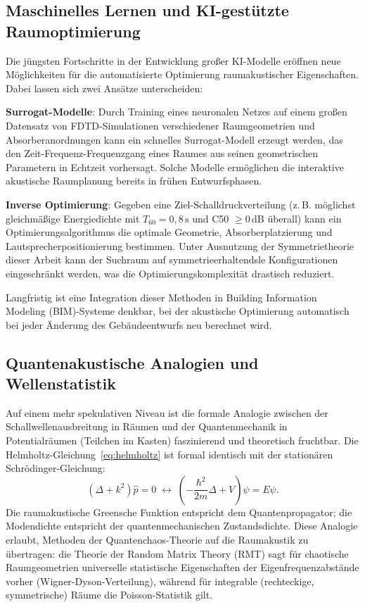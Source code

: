 ﻿\documentclass[12pt, a4paper]{article}
\theoremstyle{definition}
\theoremstyle{remark}
\begin{document}
\subsection{Maschinelles Lernen und KI-gestützte Raumoptimierung}

Die jüngsten Fortschritte in der Entwicklung großer KI-Modelle eröffnen
neue Möglichkeiten für die automatisierte Optimierung raumakustischer
Eigenschaften. Dabei lassen sich zwei Ansätze unterscheiden:

\textbf{Surrogat-Modelle}: Durch Training eines neuronalen Netzes auf
einem großen Datensatz von FDTD-Simulationen verschiedener Raumgeometrien
und Absorberanordnungen kann ein schnelles Surrogat-Modell erzeugt werden,
das den Zeit-Frequenz-Frequenzgang eines Raumes aus seinen geometrischen
Parametern in Echtzeit vorhersagt. Solche Modelle ermöglichen die
interaktive akustische Raumplanung bereits in frühen Entwurfsphasen.

\textbf{Inverse Optimierung}: Gegeben eine Ziel-Schalldruckverteilung
(z.\,B. möglichst gleichmäßige Energiedichte mit $T_{60} = 0{,}8\,\mathrm{s}$
und C50 $\geq 0$\,dB überall) kann ein Optimierungsalgorithmus
die optimale Geometrie, Absorberplatzierung und Lautsprecherpositionierung
bestimmen. Unter Ausnutzung der Symmetrietheorie dieser Arbeit kann der
Suchraum auf symmetrieerhaltendsle Konfigurationen eingeschränkt werden,
was die Optimierungskomplexität drastisch reduziert.

Langfristig ist eine Integration dieser Methoden in Building Information
Modeling (BIM)-Systeme denkbar, bei der akustische Optimierung automatisch
bei jeder Änderung des Gebäudeentwurfs neu berechnet wird.

\subsection{Quantenakustische Analogien und Wellenstatistik}

Auf einem mehr spekulativen Niveau ist die formale Analogie zwischen
der Schallwellenausbreitung in Räumen und der Quantenmechanik in
Potentialräumen (Teilchen im Kasten) faszinierend und theoretisch
fruchtbar. Die Helmholtz-Gleichung~\eqref{eq:helmholtz} ist formal
identisch mit der stationären Schrödinger-Gleichung:
\[
  (\Delta + k^2)\hat{p} = 0 \;\longleftrightarrow\;
  \left(-\frac{\hbar^2}{2m}\Delta + V\right)\psi = E\psi.
\]
Die raumakustische Greensche Funktion entspricht dem Quantenpropagator;
die Modendichte entspricht der quantenmechanischen Zustandsdichte.
Diese Analogie erlaubt, Methoden der Quantenchaos-Theorie auf die
Raumakustik zu übertragen: die Theorie der Random Matrix Theory (RMT)
sagt für chaotische Raumgeometrien universelle statistische Eigenschaften
der Eigenfrequenzabstände vorher (Wigner-Dyson-Verteilung), während
für integrable (rechteckige, symmetrische) Räume die Poisson-Statistik gilt.
\end{document}
